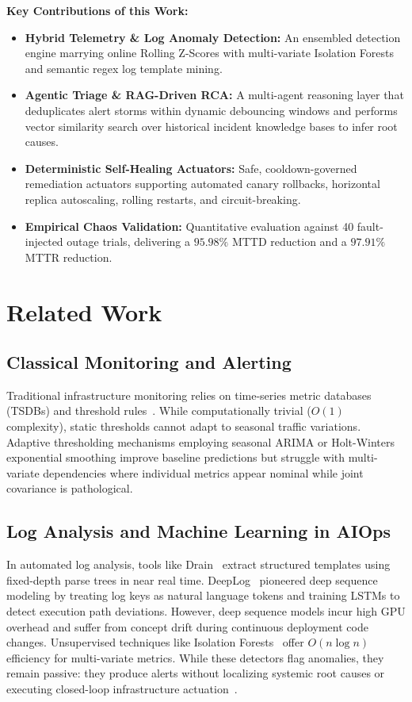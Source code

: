 \documentclass[conference]{IEEEtran}
\begin{document}
\textbf{Key Contributions of this Work:}
\begin{itemize}
    \item \textbf{Hybrid Telemetry \& Log Anomaly Detection:} An ensembled detection engine marrying online Rolling Z-Scores with multi-variate Isolation Forests and semantic regex log template mining.
    \item \textbf{Agentic Triage \& RAG-Driven RCA:} A multi-agent reasoning layer that deduplicates alert storms within dynamic debouncing windows and performs vector similarity search over historical incident knowledge bases to infer root causes.
    \item \textbf{Deterministic Self-Healing Actuators:} Safe, cooldown-governed remediation actuators supporting automated canary rollbacks, horizontal replica autoscaling, rolling restarts, and circuit-breaking.
    \item \textbf{Empirical Chaos Validation:} Quantitative evaluation against 40 fault-injected outage trials, delivering a $95.98\%$ MTTD reduction and a $97.91\%$ MTTR reduction.
\end{itemize}

\section{Related Work}
\subsection{Classical Monitoring and Alerting}
Traditional infrastructure monitoring relies on time-series metric databases (TSDBs) and threshold rules~\cite{prometheus_monitoring}. While computationally trivial ($O(1)$ complexity), static thresholds cannot adapt to seasonal traffic variations. Adaptive thresholding mechanisms employing seasonal ARIMA or Holt-Winters exponential smoothing improve baseline predictions but struggle with multi-variate dependencies where individual metrics appear nominal while joint covariance is pathological.

\subsection{Log Analysis and Machine Learning in AIOps}
In automated log analysis, tools like Drain~\cite{drain_log_parser} extract structured templates using fixed-depth parse trees in near real time. DeepLog~\cite{deeplog2017} pioneered deep sequence modeling by treating log keys as natural language tokens and training LSTMs to detect execution path deviations. However, deep sequence models incur high GPU overhead and suffer from concept drift during continuous deployment code changes. Unsupervised techniques like Isolation Forests~\cite{isolation_forest} offer $O(n \log n)$ efficiency for multi-variate metrics. While these detectors flag anomalies, they remain passive: they produce alerts without localizing systemic root causes or executing closed-loop infrastructure actuation~\cite{aiops_survey2025}.
\end{document}
